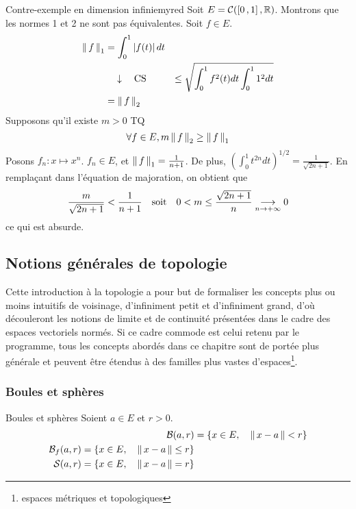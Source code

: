     \begin{omed}{Contre-exemple en dimension infinie}{myred}
        Soit $E = \mathcal{C}(\intervalleFF{0}{1}, \mathbb{R})$. Montrons que les normes 1 et 2 ne sont pas équivalentes. Soit $f \in E$. 
        \begin{align*}
            \nnorm{1}{f} 
            &= \int_{0}^{1} \abs{f(t)} dt \\
            &\argu \text{CS}
            &\leq \sqrt{\int_{0}^{1} f^2(t) dt \int_{0}^{1} 1^2 dt} \\
            &= \nnorm{2}{f}
        \end{align*}
        Supposons qu’il existe $m > 0$ TQ 
        \[ \forall f \in E, m \nnorm{2}{f} \geq \nnorm{1}{f} \]   
        Posons $f_n : x \mapsto x^n$. $f_n \in E$, et $\nnorm{1}{f} = \frac{1}{n+1}$. De plus, $\left(\int_{0}^{1} t^{2n} dt\right)^{1 / 2} = \frac{1}{\sqrt{2n + 1}}$. En remplaçant dans l’équation de majoration, on obtient que 
        \[ \frac{m}{\sqrt{2n+1}} < \frac{1}{n+1} \esp{soit} 0 < m \leq \frac{\sqrt{2n+1}}{n} \limi{n}{+\infty} 0 \]   
        ce qui est absurde.
    \end{omed}

\subsection{Notions générales de topologie}

    Cette introduction à la topologie a pour but de formaliser les concepts plus ou moins intuitifs de voisinage, d’infiniment petit et d’infiniment grand, d’où découleront les notions de limite et de continuité présentées dans le cadre des espaces vectoriels normés. Si ce cadre commode est celui retenu par le programme, tous les concepts abordés dans ce chapitre sont de portée plus générale et peuvent être étendus à des familles plus vastes d’espaces\footnote[2]{espaces métriques et topologiques}.

    \subsubsection{Boules et sphères}

    \begin{defi}{Boules et sphères}{}
        Soient $a \in E$ et $r > 0$. 
        \begin{align*}
            \mathcal{B}(a,r) &= \left\{x \in E, \quad \norm{x - a} < r\right\} \\
            \mathcal{B}_f(a,r) = \left\{x \in E, \quad \norm{x - a} \leq r\right\} \\
            \mathcal{S}(a,r) = \left\{x \in E, \quad \norm{x - a} = r\right\}
        \end{align*}
    \end{defi}

